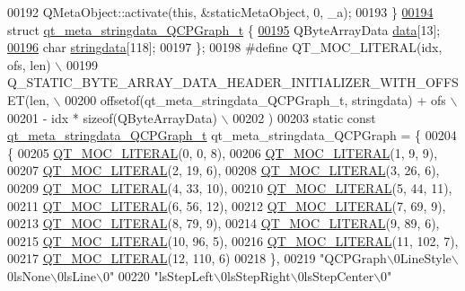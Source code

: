 \begin{DoxyCode}
00192     QMetaObject::activate(\textcolor{keyword}{this}, &staticMetaObject, 0, \_a);
00193 \}
\hypertarget{a00067_source_l00194}{}\hyperlink{a00067}{00194} \textcolor{keyword}{struct }\hyperlink{a00067_d7/ded/a00196}{qt\_meta\_stringdata\_QCPGraph\_t} \{
\hypertarget{a00067_source_l00195}{}\hyperlink{a00067_a52173b02d8396dce2aa3a046123398ea}{00195}     QByteArrayData \hyperlink{a00067_a52173b02d8396dce2aa3a046123398ea}{data}[13];
\hypertarget{a00067_source_l00196}{}\hyperlink{a00067_a8d599799df5356cb10dc7a790a0e26a2}{00196}     \textcolor{keywordtype}{char} \hyperlink{a00067_a8d599799df5356cb10dc7a790a0e26a2}{stringdata}[118];
00197 \};
00198 \textcolor{preprocessor}{#define QT\_MOC\_LITERAL(idx, ofs, len) \(\backslash\)}
00199 \textcolor{preprocessor}{    Q\_STATIC\_BYTE\_ARRAY\_DATA\_HEADER\_INITIALIZER\_WITH\_OFFSET(len, \(\backslash\)}
00200 \textcolor{preprocessor}{    offsetof(qt\_meta\_stringdata\_QCPGraph\_t, stringdata) + ofs \(\backslash\)}
00201 \textcolor{preprocessor}{        - idx * sizeof(QByteArrayData) \(\backslash\)}
00202 \textcolor{preprocessor}{    )}
00203 \textcolor{keyword}{static} \textcolor{keyword}{const} \hyperlink{a00067_d7/ded/a00196}{qt\_meta\_stringdata\_QCPGraph\_t} qt\_meta\_stringdata\_QCPGraph = \{
00204     \{
00205 \hyperlink{a00067_a75bb9482d242cde0a06c9dbdc6b83abe}{QT\_MOC\_LITERAL}(0, 0, 8),
00206 \hyperlink{a00067_a75bb9482d242cde0a06c9dbdc6b83abe}{QT\_MOC\_LITERAL}(1, 9, 9),
00207 \hyperlink{a00067_a75bb9482d242cde0a06c9dbdc6b83abe}{QT\_MOC\_LITERAL}(2, 19, 6),
00208 \hyperlink{a00067_a75bb9482d242cde0a06c9dbdc6b83abe}{QT\_MOC\_LITERAL}(3, 26, 6),
00209 \hyperlink{a00067_a75bb9482d242cde0a06c9dbdc6b83abe}{QT\_MOC\_LITERAL}(4, 33, 10),
00210 \hyperlink{a00067_a75bb9482d242cde0a06c9dbdc6b83abe}{QT\_MOC\_LITERAL}(5, 44, 11),
00211 \hyperlink{a00067_a75bb9482d242cde0a06c9dbdc6b83abe}{QT\_MOC\_LITERAL}(6, 56, 12),
00212 \hyperlink{a00067_a75bb9482d242cde0a06c9dbdc6b83abe}{QT\_MOC\_LITERAL}(7, 69, 9),
00213 \hyperlink{a00067_a75bb9482d242cde0a06c9dbdc6b83abe}{QT\_MOC\_LITERAL}(8, 79, 9),
00214 \hyperlink{a00067_a75bb9482d242cde0a06c9dbdc6b83abe}{QT\_MOC\_LITERAL}(9, 89, 6),
00215 \hyperlink{a00067_a75bb9482d242cde0a06c9dbdc6b83abe}{QT\_MOC\_LITERAL}(10, 96, 5),
00216 \hyperlink{a00067_a75bb9482d242cde0a06c9dbdc6b83abe}{QT\_MOC\_LITERAL}(11, 102, 7),
00217 \hyperlink{a00067_a75bb9482d242cde0a06c9dbdc6b83abe}{QT\_MOC\_LITERAL}(12, 110, 6)
00218     \},
00219     \textcolor{stringliteral}{"QCPGraph\(\backslash\)0LineStyle\(\backslash\)0lsNone\(\backslash\)0lsLine\(\backslash\)0"}
00220     \textcolor{stringliteral}{"lsStepLeft\(\backslash\)0lsStepRight\(\backslash\)0lsStepCenter\(\backslash\)0"}

\end{DoxyCode}
